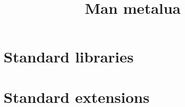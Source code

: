 \documentclass{book}
\title{Man metalua}
\begin{document}
\pagestyle{fancy}
\setlength\parskip{0.2cm}

\maketitle
\tableofcontents




\chapter{Standard libraries}






\chapter{Standard extensions}




%



%
\appendix


\end{document}
